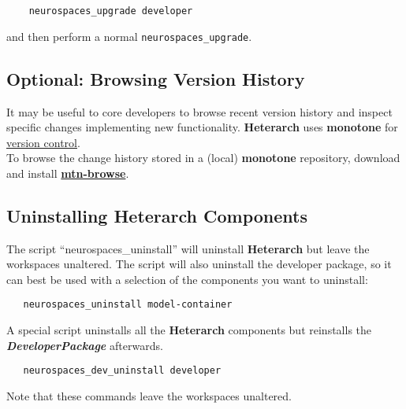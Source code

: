 \documentclass[12pt]{article}
\begin{document}
\begin{verbatim}
    neurospaces_upgrade developer
\end{verbatim}
and then perform a normal {\tt neurospaces\_upgrade}.
 
\subsection*{Optional: Browsing Version History}

It may be useful to core developers to browse recent version history
and inspect specific changes implementing new functionality.  {\bf\small Heterarch} uses {\bf monotone} for
\href{../version-control/version-control.tex}{version control}.\\
To browse the change history stored in a (local) {\bf monotone}
repository,
 download and install \href{http://www.coosoft.plus.com/software.html}{\bf mtn-browse}.


\subsection*{Uninstalling Heterarch Components}

The script ``neurospaces\_uninstall'' will uninstall
{\bf\small{Heterarch}} but leave the workspaces unaltered.  The script
will also uninstall the developer package, so it can best be used with
a selection of the components you want to uninstall:

\begin{verbatim}
   neurospaces_uninstall model-container
\end{verbatim}
A special script uninstalls all the {\bf\small Heterarch} components but reinstalls the
{\bf{\emph{DeveloperPackage}}} afterwards.

\begin{verbatim}
   neurospaces_dev_uninstall developer
\end{verbatim}
Note that these commands leave the workspaces unaltered.
\end{document}
